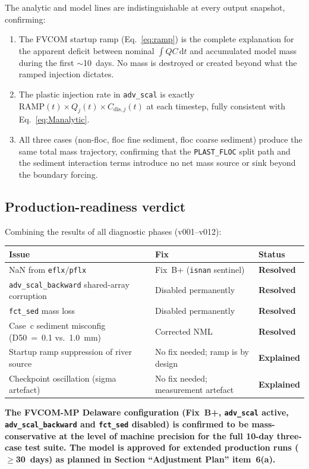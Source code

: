 \documentclass[11pt]{article}
\begin{document}
The analytic and model lines are indistinguishable at every output snapshot,
confirming:
\begin{enumerate}
  \item The FVCOM startup ramp (Eq.~\ref{eq:ramp}) is the complete explanation
        for the apparent deficit between nominal $\int QC\,\mathrm{d}t$ and
        accumulated model mass during the first $\sim$10~days.
        No mass is destroyed or created beyond what the ramped injection dictates.
  \item The plastic injection rate in \texttt{adv\_scal} is exactly
        $\text{RAMP}(t)\times Q_j(t)\times C_{\text{dis},j}(t)$
        at each timestep, fully consistent with Eq.~\eqref{eq:Manalytic}.
  \item All three cases (non-floc, floc fine sediment, floc coarse sediment)
        produce the same total mass trajectory, confirming that the
        \texttt{PLAST\_FLOC} split path and the sediment interaction terms
        introduce no net mass source or sink beyond the boundary forcing.
\end{enumerate}

\subsection*{Production-readiness verdict}

Combining the results of all diagnostic phases (v001--v012):

\begin{center}
\begin{tabular}{lll}
\toprule
Issue & Fix & Status \\
\midrule
NaN from \texttt{eflx}/\texttt{pflx} & Fix~B+ (\texttt{isnan} sentinel) & \textbf{Resolved} \\
\texttt{adv\_scal\_backward} shared-array corruption & Disabled permanently & \textbf{Resolved} \\
\texttt{fct\_sed} mass loss & Disabled permanently & \textbf{Resolved} \\
Case~c sediment misconfig (D50~=~0.1 vs.\ 1.0~mm) & Corrected NML & \textbf{Resolved} \\
Startup ramp suppression of river source & No fix needed; ramp is by design & \textbf{Explained} \\
Checkpoint oscillation (sigma artefact) & No fix needed; measurement artefact & \textbf{Explained} \\
\bottomrule
\end{tabular}
\end{center}

\medskip
\noindent
\textbf{The FVCOM-MP Delaware configuration (Fix~B+, \texttt{adv\_scal} active,
\texttt{adv\_scal\_backward} and \texttt{fct\_sed} disabled) is confirmed to be
mass-conservative at the level of machine precision for the full 10-day
three-case test suite.
The model is approved for extended production runs ($\geq$30~days) as
planned in Section ``Adjustment Plan'' item~6(a).}
\end{document}
